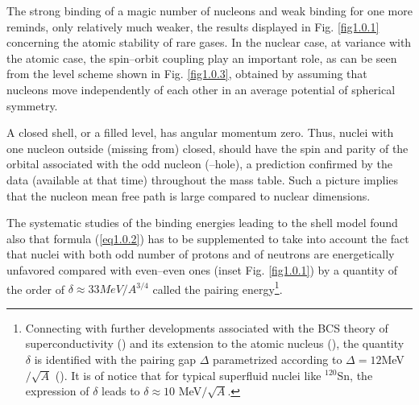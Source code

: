 \documentclass[a4paper,11pt]{book}
\numberwithin{equation}{section}
\numberwithin{figure}{section}
\numberwithin{table}{section}
\begin{document}
The strong binding of a magic number of nucleons and weak binding for one more reminds, only relatively much weaker, the results displayed in Fig.  \ref{fig1.0.1}  concerning the atomic stability of rare gases. In the nuclear case, at variance with the atomic case, the spin--orbit coupling play an important role, as can be seen from the level scheme shown in Fig. \ref{fig1.0.3}, obtained by assuming that nucleons move independently of each other in an average potential  of  spherical symmetry.


A closed shell, or a filled level, has angular momentum zero. Thus, nuclei with one nucleon outside (missing from) closed, should have the spin and parity of the orbital associated with the odd nucleon (--hole), a prediction confirmed by the data (available at that time) throughout the mass table. Such a picture implies that the nucleon mean free path is large compared to nuclear dimensions.


The systematic studies of the binding energies leading to the shell model found also that formula (\ref{eq1.0.2}) has to be supplemented to take into account the fact that nuclei with both odd number of protons and of neutrons are energetically unfavored compared with even--even ones (inset Fig. \ref{fig1.0.1}) by a quantity of the order of $\delta\approx33MeV/A^{3/4}$ called the pairing energy\footnote{Connecting with further developments associated with the BCS theory of superconductivity (\cite{Bardeen:57a,Bardeen:57b}) and its extension to the atomic nucleus (\cite{Bohr:58}), the quantity $\delta$ is identified with the pairing gap $\Delta$ parametrized according to $\Delta=12 $MeV$/\sqrt{A}$ (\cite{Bohr:69}). It is of notice that for typical superfluid nuclei like $^{120}$Sn, the expression of $\delta$ leads to $\delta\approx10$ MeV$/\sqrt{A}$.}.
\end{document}
